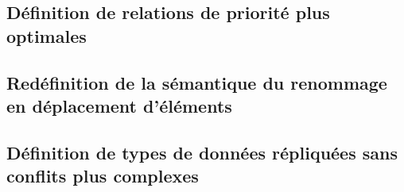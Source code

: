 \documentclass[12pt]{thesul}
\begin{document}
\subsection{Définition de relations de priorité plus optimales}
\subsection{Redéfinition de la sémantique du renommage en déplacement d'éléments}
\subsection{Définition de types de données répliquées sans conflits plus complexes}
% 

% 

%

\PrintIndex

\onecolumn



%

\printbibliography

\end{document}
